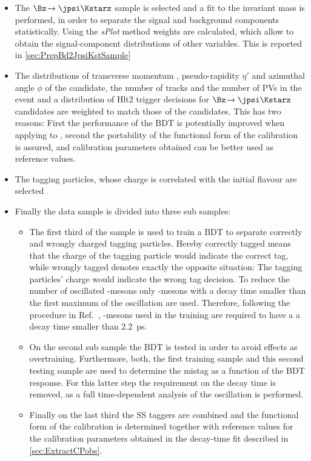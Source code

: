 \begin{itemize}
	\item The $\Bz\!\to\jpsi\Kstarz$ sample is selected and a fit to the invariant mass is performed, in order to separate the signal and background components statistically.
	Using the \emph{sPlot} method weights are calculated, which allow to obtain the signal-component distributions of other variables. This is reported in \cref{sec:PrepBd2JpsiKstSample}
	\item The distributions of transverse momentum \pt, pseudo-rapidity $\eta'$ and azimuthal angle $\phi$ of the \Bz candidate, the number of tracks and the number of \ac{PV}s in the event and a distribution of Hlt2 trigger decisions for $\Bz\!\to\jpsi\Kstarz$ candidates are weighted to match those of the \BdToDpi candidates.
	This has two reasons: First the performance of the BDT is potentially improved when applying to \BdToDpi, second the portability of the functional form of the calibration is assured, and calibration parameters obtained can be better used as reference values.
	\item The tagging particles, whose charge is correlated with the initial \B flavour are selected
	\item Finally the data sample is divided into three sub samples:
	\begin{itemize}
		\item The first third of the sample is used to train a BDT to separate correctly and wrongly charged tagging particles.
		Hereby correctly tagged means that the charge of the tagging particle would indicate the correct tag, while wrongly tagged denotes exactly the opposite situation: The tagging particles' charge would indicate the wrong tag decision.
		To reduce the number of oscillated \Bz-mesons only \Bz-mesons with a decay time smaller than the first maximum of the oscillation are used.
		Therefore, following the procedure in Ref.~\cite{Aaij:2016rdg}, \Bz-mesons used in the training are required to have a a decay time smaller than \SI{2.2}{\pico\second}.
		\item On the second sub sample the BDT is tested in order to avoid effects as overtraining.
		Furthermore, both, the first training sample and this second testing sample are used to determine the mistag as a function of the BDT response. For this latter step the requirement on the \Bz decay time is removed, as a full time-dependent analysis of the \Bz oscillation is performed.
		\item Finally on the last third the SS taggers are combined and the functional form of the calibration is determined together with reference values for the calibration parameters obtained in the decay-time fit described in \cref{sec:ExtractCPobs}.
	\end{itemize}
\end{itemize}

